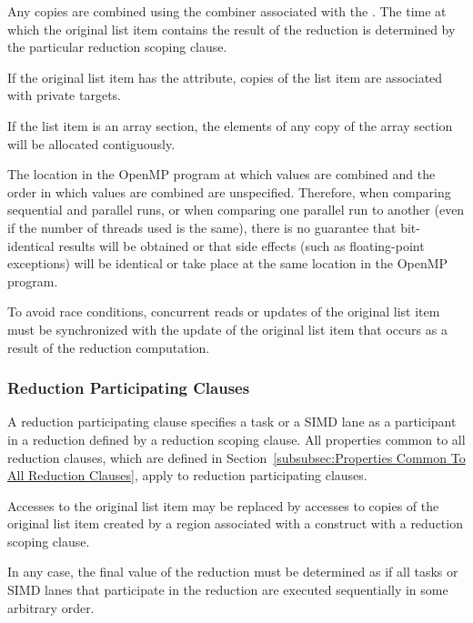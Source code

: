 {{{{Any copies are combined using the combiner associated with the
. The time at which the original list item contains the result
of the reduction is determined by the particular reduction scoping clause.

\begin{samepage}
\fortranspecificstart
If the original list item has the  attribute, copies of
the list item are associated with private targets.
\fortranspecificend
\end{samepage}

If the list item is an array section, the elements of any copy of the array section will
be allocated contiguously.

The location in the OpenMP program at which values are combined and the
order in which values are combined are unspecified. Therefore, when
comparing sequential and parallel runs, or when comparing one parallel run to
another (even if the number of threads used is the same), there is no guarantee
that bit-identical results will be obtained or that side effects (such as
floating-point exceptions) will be identical or take place at the same location
in the OpenMP program.

To avoid race conditions, concurrent reads or updates of the original list item
must be synchronized with the update of the original list item that occurs as a
result of the reduction computation.










\subsubsection{Reduction Participating Clauses}
\label{subsubsec:Reduction Participating Clauses}
A reduction participating clause specifies a task or a SIMD lane as a
participant in a reduction defined by a reduction scoping clause.
All properties common to all reduction clauses, which are defined in
Section~\ref{subsubsec:Properties Common To All Reduction Clauses}, apply to
reduction participating clauses.

Accesses to the original list item may be replaced by accesses to copies of the
original list item created by a region associated with a construct with a
reduction scoping clause.

In any case, the final value of the reduction must be determined as if all tasks
or SIMD lanes that participate in the reduction are executed sequentially in
some arbitrary order.










}}}}
